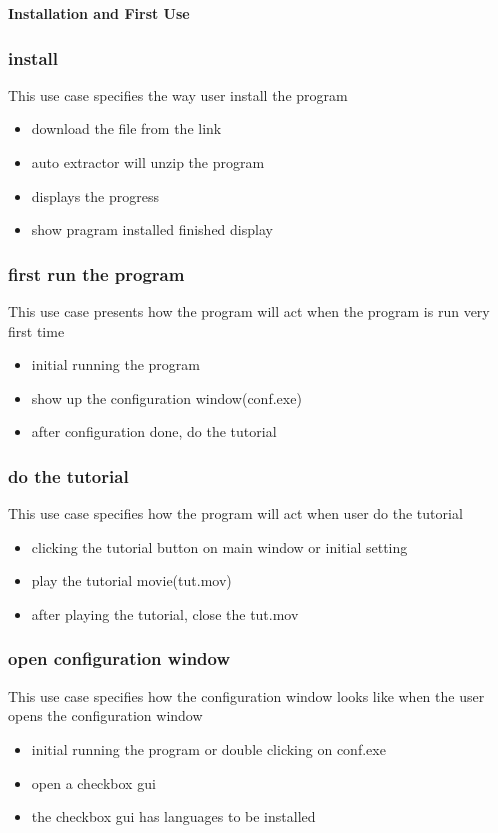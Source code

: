 \documentclass[conference]{IEEEtran}
\begin{document}
\textbf{Installation and First Use}

\subsubsection{install}
This use case specifies the way user install the program

\begin{itemize}
  \item download the file from the link
  \item auto extractor will unzip the program
  \item displays the progress
  \item show pragram installed finished display
\end{itemize}
\textit{}



\subsubsection{first run the program}
This use case presents how the program will act when the program is run very first time
\begin{itemize}
  \item initial running the program
  \item show up the configuration window(conf.exe)
  \item after configuration done, do the tutorial
\end{itemize}
\textit{}



\subsubsection{do the tutorial}
This use case specifies how the program will act when user do the tutorial
\begin{itemize}
  \item clicking the tutorial button on main window or initial setting 
  \item play the tutorial movie(tut.mov)
  \item after playing the tutorial, close the tut.mov
\end{itemize}
\textit{}



\subsubsection{open configuration window}
This use case specifies how the configuration window looks like when the user opens the configuration window
\begin{itemize}
  \item initial running the program or double clicking on conf.exe
  \item open a checkbox gui
  \item the checkbox gui has languages to be installed
\end{itemize}
\textit{}
\end{document}
